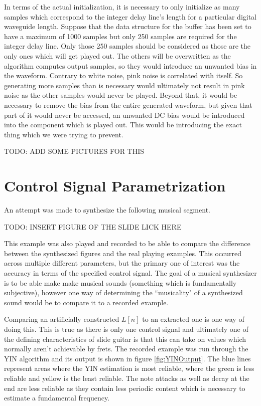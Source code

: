 \documentclass[../main.tex]{subfiles}
\begin{document}
In terms of the actual initialization, it is necessary to only initialize as many samples which correspond to the integer delay line's length for a particular digital waveguide length. Suppose that the data structure for the buffer has been set to have a maximum of 1000 samples but only 250 samples are required for the integer delay line. Only those 250 samples should be considered as those are the only ones which will get played out. The others will be overwritten as the algorithm computes output samples, so they would introduce an unwanted bias in the waveform. Contrary to white noise, pink noise is correlated with itself. So generating more samples than is necessary would ultimately not result in pink noise as the other samples would never be played. Beyond that, it would be necessary to remove the bias from the entire generated waveform, but given that part of it would never be accessed, an unwanted DC bias would be introduced into the component which is played out. This would be introducing the exact thing which we were trying to prevent.

TODO: ADD SOME PICTURES FOR THIS

\section{Control Signal Parametrization}
An attempt was made to synthesize the following musical segment.

TODO: INSERT FIGURE OF THE SLIDE LICK HERE

This example was also played and recorded to be able to compare the difference between the synthesized figures and the real playing examples. This occurred across multiple different parameters, but the primary one of interest was the accuracy in terms of the specified control signal. The goal of a musical synthesizer is to be able make make musical sounds (something which is fundamentally subjective), however one way of determining the ``musicality" of a synthesized sound would be to compare it to a recorded example.

Comparing an artificially constructed $L[n]$ to an extracted one is one way of doing this. This is true as there is only one control signal and ultimately one of the defining characteristics of slide guitar is that this can take on values which normally aren't achievable by frets. The recorded example was run through the YIN algorithm and its output is shown in figure \ref{fig:YINOutput}. The blue lines represent areas where the YIN estimation is most reliable, where the green is less reliable and yellow is the least reliable. The note attacks as well as decay at the end are less reliable as they contain less periodic content which is necessary to estimate a fundamental frequency.
\end{document}
